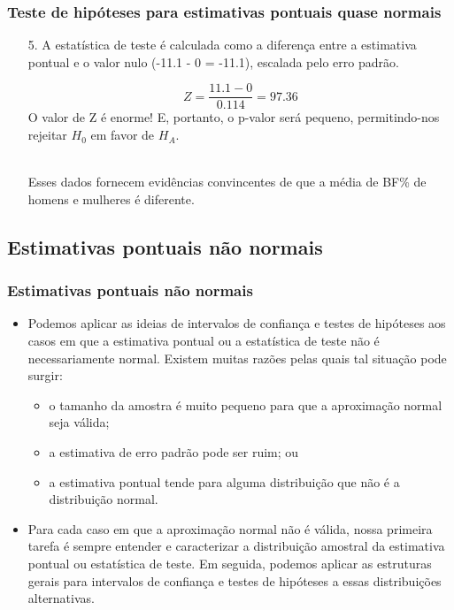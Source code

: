 
\begin{frame}
\frametitle{Teste de hipóteses para estimativas pontuais quase normais}
\begin{enumerate}
\justifying
\item[5.] A estatística de teste é calculada como a diferença entre a estimativa pontual e o valor nulo (-11.1 - 0 = -11.1), escalada pelo erro padrão.

\[ Z = \frac{11.1 - 0}{0.114} = 97.36 \]
\justifying
O valor de Z é enorme! E, portanto, o p-valor será pequeno, permitindo-nos rejeitar $H_0$ em favor de $H_A$.

\pause

$\:$ \\
\justifying
Esses dados fornecem evidências convincentes de que a média de BF\% de homens e mulheres é diferente.

\end{enumerate}

\end{frame}


\subsection{Estimativas pontuais não normais}


\begin{frame}
\frametitle{Estimativas pontuais não normais}

\begin{itemize}
\justifying
\item Podemos aplicar as ideias de intervalos de confiança e testes de hipóteses aos casos em que a estimativa pontual ou a estatística de teste não é necessariamente normal. Existem muitas razões pelas quais tal situação pode surgir:
\begin{itemize}
\justifying
\item o tamanho da amostra é muito pequeno para que a aproximação normal seja válida;
\justifying
\item a estimativa de erro padrão pode ser ruim; ou
\justifying
\item a estimativa pontual tende para alguma distribuição que não é a distribuição normal.
\end{itemize}
\justifying
\item Para cada caso em que a aproximação normal não é válida, nossa primeira tarefa é sempre entender e caracterizar a distribuição amostral da estimativa pontual ou estatística de teste. Em seguida, podemos aplicar as estruturas gerais para intervalos de confiança e testes de hipóteses a essas distribuições alternativas.

\end{itemize}

\end{frame}


